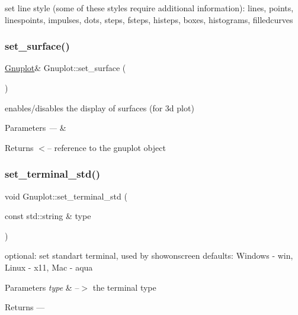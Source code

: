 set line style (some of these styles require additional information)\+: lines, points, linespoints, impulses, dots, steps, fsteps, histeps, boxes, histograms, filledcurves \mbox{\label{class_gnuplot_a9825bd26500e30ca88404c4807e6607a}} 
\subsubsection{\texorpdfstring{set\+\_\+surface()}{set\_surface()}}
{\footnotesize\ttfamily \mbox{\hyperlink{class_gnuplot}{Gnuplot}}\& Gnuplot\+::set\+\_\+surface (\begin{DoxyParamCaption}{ }\end{DoxyParamCaption})\hspace{0.3cm}{\ttfamily [inline]}}

enables/disables the display of surfaces (for 3d plot)


\begin{DoxyParams}{Parameters}
{\em ---} & ~\newline
 \\
\hline
\end{DoxyParams}
\begin{DoxyReturn}{Returns}
$<$-- reference to the gnuplot object 
\end{DoxyReturn}
\mbox{\label{class_gnuplot_a21feba7a3916708b742c3dc25850ab2f}} 
\subsubsection{\texorpdfstring{set\+\_\+terminal\+\_\+std()}{set\_terminal\_std()}}
{\footnotesize\ttfamily void Gnuplot\+::set\+\_\+terminal\+\_\+std (\begin{DoxyParamCaption}\item[{const std\+::string \&}]{type }\end{DoxyParamCaption})\hspace{0.3cm}{\ttfamily [static]}}

optional\+: set standart terminal, used by showonscreen defaults\+: Windows -\/ win, Linux -\/ x11, Mac -\/ aqua


\begin{DoxyParams}{Parameters}
{\em type} & --$>$ the terminal type\\
\hline
\end{DoxyParams}
\begin{DoxyReturn}{Returns}
--- 
\end{DoxyReturn}
\mbox{\label{class_gnuplot_a4f93bac0e69dd83806652ca7226c6b3b}} 
